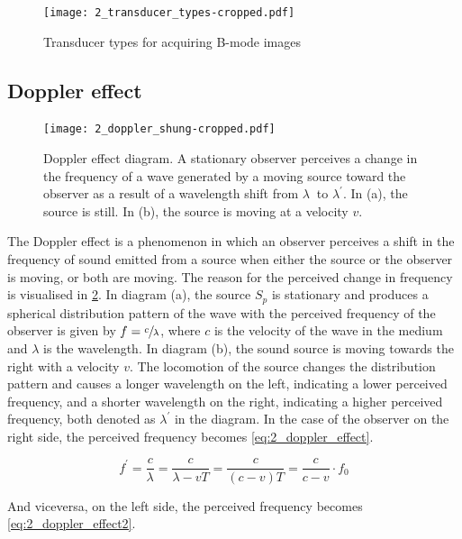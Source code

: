 \begin{figure}[htbp]
	\centering
	\texttt{[image: 2\_transducer\_types-cropped.pdf]}
	\caption[Transducer types for acquiring B-mode images]{Transducer types for acquiring B-mode images \cite{JensenUltrasoundBook}}
	\label{fig:2_transducer_types}
\end{figure}

\subsection{Doppler effect} \label{sec:doppler_effect}

\begin{figure}[htbp]
	\centering
	\texttt{[image: 2\_doppler\_shung-cropped.pdf]}
	\caption[Doppler effect diagram]{Doppler effect diagram. A stationary observer perceives a change in the frequency of a wave generated by a moving source toward the observer as a result of a wavelength shift from $\lambda\ $ to $\lambda^{\prime}$. In (a), the source is still. In (b), the source is moving at a velocity $v$. \cite{ShungUltrasound_Book}}
	\label{fig:2_doppler_effect}
\end{figure}

The Doppler effect is a phenomenon in which an observer perceives a shift in the frequency of sound emitted from a source when either the source or the observer is moving, or both are moving. The reason for the perceived change in frequency is visualised in \cref{fig:2_doppler_effect}. In diagram (a), the source $S_{p}$ is stationary and produces a spherical distribution pattern of the wave with the perceived frequency of the observer is given by $f=\sfrac{c}{\lambda}$, where $c$ is the velocity of the wave in the medium and $\lambda$ is the wavelength. In diagram (b), the sound source is moving towards the right with a velocity $v$. The locomotion of the source changes the distribution pattern and causes a longer wavelength on the left, indicating a lower perceived frequency, and a shorter wavelength on the right, indicating a higher perceived frequency, both denoted as $\lambda^{\prime}$ in the diagram. In the case of the observer on the right side, the perceived frequency becomes \cref{eq:2_doppler_effect}.

\begin{equation} \label{eq:2_doppler_effect}
	f^{\prime} = \frac{c}{\lambda} = \frac{c}{\lambda - v T} = \frac{c}{(c-v)T} = \frac{c}{c-v}\cdot f_{0}
\end{equation}

And viceversa, on the left side, the perceived frequency becomes \cref{eq:2_doppler_effect2}.

